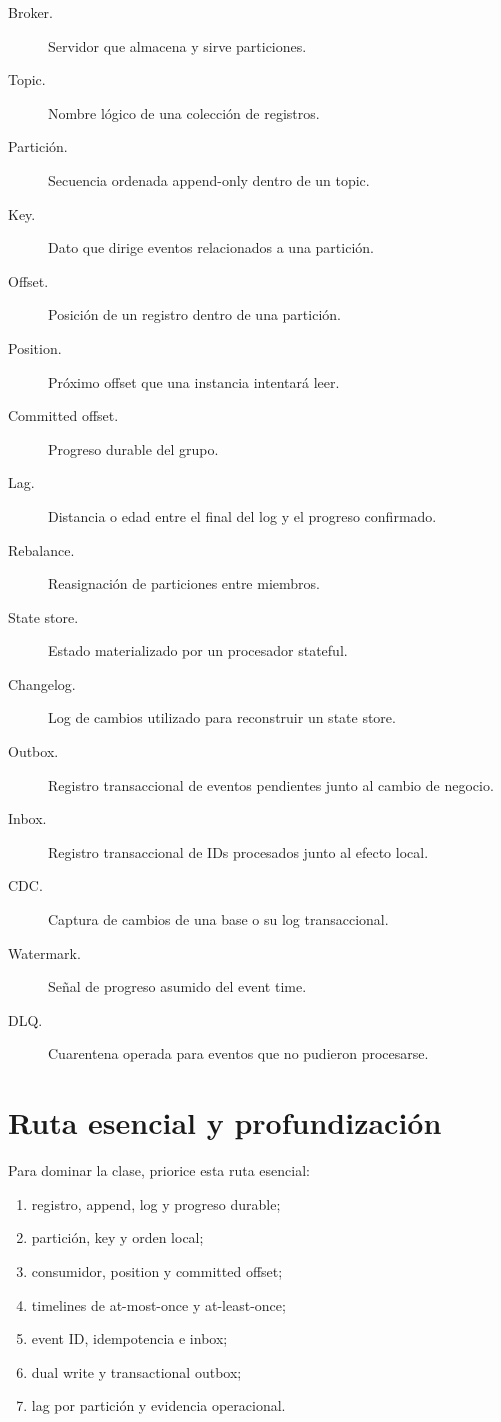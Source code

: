 \documentclass[variant=apuntes,cover=institutional,mode=screen]{ua-engineering-v6-article}
\begin{document}
\begin{description}
\item[Broker.] Servidor que almacena y sirve particiones.
\item[Topic.] Nombre lógico de una colección de registros.
\item[Partición.] Secuencia ordenada append-only dentro de un topic.
\item[Key.] Dato que dirige eventos relacionados a una partición.
\item[Offset.] Posición de un registro dentro de una partición.
\item[Position.] Próximo offset que una instancia intentará leer.
\item[Committed offset.] Progreso durable del grupo.
\item[Lag.] Distancia o edad entre el final del log y el progreso confirmado.
\item[Rebalance.] Reasignación de particiones entre miembros.
\item[State store.] Estado materializado por un procesador stateful.
\item[Changelog.] Log de cambios utilizado para reconstruir un state store.
\item[Outbox.] Registro transaccional de eventos pendientes junto al cambio de negocio.
\item[Inbox.] Registro transaccional de IDs procesados junto al efecto local.
\item[CDC.] Captura de cambios de una base o su log transaccional.
\item[Watermark.] Señal de progreso asumido del event time.
\item[DLQ.] Cuarentena operada para eventos que no pudieron procesarse.
\end{description}


\section{Ruta esencial y profundización}

Para dominar la clase, priorice esta ruta esencial:

\begin{enumerate}
\item registro, append, log y progreso durable;
\item partición, key y orden local;
\item consumidor, position y committed offset;
\item timelines de at-most-once y at-least-once;
\item event ID, idempotencia e inbox;
\item dual write y transactional outbox;
\item lag por partición y evidencia operacional.
\end{enumerate}
\end{document}
